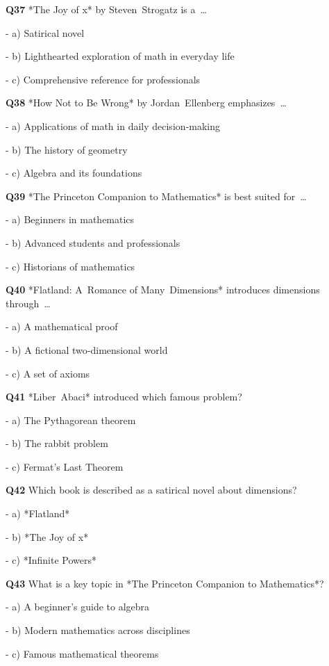 \textbf{Q37} *The Joy of x* by Steven Strogatz is a …\par
\quad - a) Satirical novel\par
\quad - b) Lighthearted exploration of math in everyday life\par
\quad - c) Comprehensive reference for professionals\par

\textbf{Q38} *How Not to Be Wrong* by Jordan Ellenberg emphasizes …\par
\quad - a) Applications of math in daily decision‑making\par
\quad - b) The history of geometry\par
\quad - c) Algebra and its foundations\par

\textbf{Q39} *The Princeton Companion to Mathematics* is best suited for …\par
\quad - a) Beginners in mathematics\par
\quad - b) Advanced students and professionals\par
\quad - c) Historians of mathematics\par

\textbf{Q40} *Flatland: A Romance of Many Dimensions* introduces dimensions through …\par
\quad - a) A mathematical proof\par
\quad - b) A fictional two‑dimensional world\par
\quad - c) A set of axioms\par

\textbf{Q41} *Liber Abaci* introduced which famous problem?\par
\quad - a) The Pythagorean theorem\par
\quad - b) The rabbit problem\par
\quad - c) Fermat's Last Theorem\par

\textbf{Q42} Which book is described as a satirical novel about dimensions?\par
\quad - a) *Flatland*\par
\quad - b) *The Joy of x*\par
\quad - c) *Infinite Powers*\par

\textbf{Q43} What is a key topic in *The Princeton Companion to Mathematics*?\par
\quad - a) A beginner's guide to algebra\par
\quad - b) Modern mathematics across disciplines\par
\quad - c) Famous mathematical theorems\par

